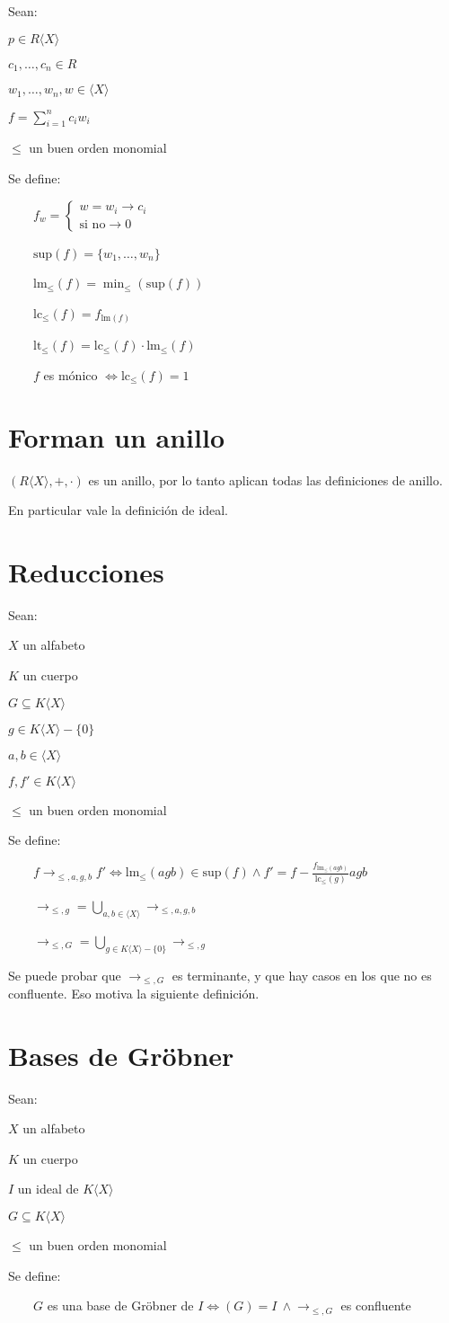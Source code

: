 \documentclass{amsbook}
\begin{document}
Sean:

$p ∈ R⟨X⟩$

$c_1, …, c_n ∈ R$

$w_1, …, w_n, w ∈ ⟨X⟩$

$f = \sum_{i = 1}^n c_i w_i$

$≤$ un buen orden monomial

Se define:

    $f_w = \left\{\begin{array}{ll} w = w_i → c_i \\ \text{si no} → 0  \end{array} \right. $

    $\text{sup}(f) = \{w_1, …, w_n\}$

    $\text{lm}_≤(f) = \min_≤(\text{sup}(f))$

    $\text{lc}_≤(f) = f_{\text{lm}(f)}$

    $\text{lt}_≤(f) = \text{lc}_≤(f) · \text{lm}_≤(f)$

    $f$ es mónico $⇔ \text{lc}_≤(f) = 1$

\section{Forman un anillo}

$(R⟨X⟩, +, ·)$ es un anillo, por lo tanto aplican todas las definiciones de anillo.

En particular vale la definición de ideal.

\section{Reducciones}

Sean:

$X$ un alfabeto

$K$ un cuerpo

$G ⊆ K⟨X⟩$

$g ∈ K⟨X⟩ - \{0\}$

$a, b ∈ ⟨X⟩$

$f, f' ∈ K⟨X⟩$

$≤$ un buen orden monomial

Se define:

    $f →_{≤, a, g, b} f' ⇔ \text{lm}_≤(agb) ∈ \text{sup}(f) ∧ f' = f - \frac{f_{\text{lm}_≤(agb)}}{\text{lc}_≤(g)}agb$

    $→_{≤, g} = \bigcup_{a, b ∈ ⟨X⟩} →_{≤, a, g, b}$

    $→_{≤, G} = \bigcup_{g ∈ K⟨X⟩ - \{0\}} →_{≤, g}$

Se puede probar que $→_{≤, G}$ es terminante, y que hay casos en los que no es confluente. Eso motiva la siguiente definición.

\section{Bases de Gröbner}

Sean:

$X$ un alfabeto

$K$ un cuerpo

$I$ un ideal de $K⟨X⟩$

$G ⊆ K⟨X⟩$

$≤$ un buen orden monomial

Se define:

    $G$ es una base de Gröbner de $I ⇔ (G) = I \ ∧ →_{≤, G}$ es confluente
\end{document}
